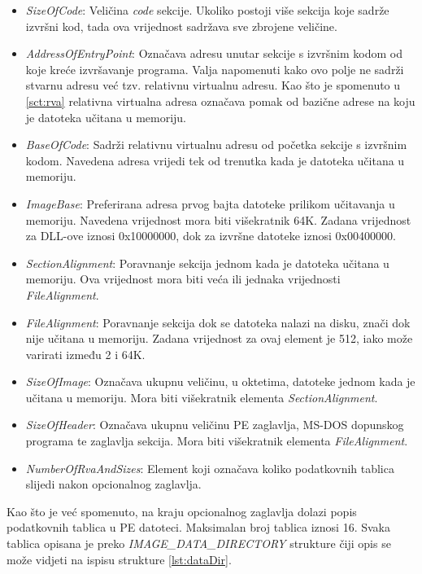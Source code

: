 \documentclass[times, utf8, diplomski, numeric]{fer}
\begin{document}
\begin{itemize}
\item \emph{SizeOfCode}: Veličina \emph{code} sekcije. Ukoliko
postoji više sekcija koje sadrže izvršni kod, tada ova vrijednost
sadržava sve zbrojene veličine.

\item \emph{AddressOfEntryPoint}: Označava adresu unutar sekcije
s izvršnim kodom od koje kreće izvršavanje programa. Valja
napomenuti kako ovo polje ne sadrži stvarnu adresu već tzv.
relativnu virtualnu adresu. Kao što je spomenuto u \ref{sct:rva} 
relativna virtualna adresa označava pomak od bazične adrese na
koju je datoteka učitana u memoriju.

\item \emph{BaseOfCode}: Sadrži relativnu virtualnu adresu od
početka sekcije s izvršnim kodom. Navedena adresa vrijedi tek od
trenutka kada je datoteka učitana u memoriju.

\item \emph{ImageBase}: Preferirana adresa prvog bajta datoteke
prilikom učitavanja u memoriju. Navedena vrijednost mora biti
višekratnik 64K. Zadana vrijednost za DLL-ove iznosi 0x10000000,
dok za izvršne datoteke iznosi 0x00400000.

\item \emph{SectionAlignment}: Poravnanje sekcija jednom kada je
datoteka učitana u memoriju. Ova vrijednost mora biti veća ili
jednaka vrijednosti \emph{FileAlignment}.

\item \emph{FileAlignment}: Poravnanje sekcija dok se datoteka
nalazi na disku, znači dok nije učitana u memoriju. Zadana
vrijednost za ovaj element je 512, iako može varirati između 2 i
64K.

\item \emph{SizeOfImage}: Označava ukupnu veličinu, u oktetima,
datoteke jednom kada je učitana u memoriju. Mora biti višekratnik
elementa \emph{SectionAlignment}.

\item \emph{SizeOfHeader}: Označava ukupnu veličinu PE zaglavlja,
MS-DOS dopunskog programa te zaglavlja sekcija. Mora biti
višekratnik elementa \emph{FileAlignment}.

\item \emph{NumberOfRvaAndSizes}: Element koji označava koliko
podatkovnih tablica slijedi nakon opcionalnog zaglavlja.
\end{itemize}

Kao što je već spomenuto, na kraju opcionalnog zaglavlja dolazi popis podatkovnih tablica u PE datoteci. Maksimalan broj tablica iznosi 16. Svaka tablica opisana je preko \emph{IMAGE\_DATA\_DIRECTORY} strukture čiji opis se može vidjeti na ispisu strukture \ref{lst:dataDir}.
\end{document}
